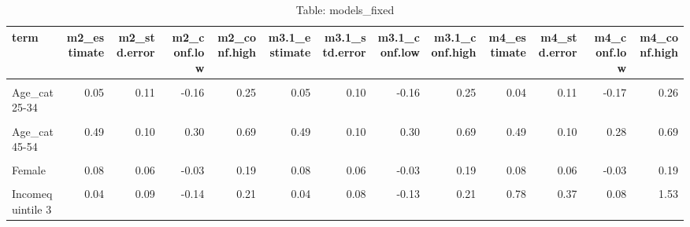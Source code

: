\begin{table}
\centering
\caption{Table:  models_fixed}
\centering
\fontsize{10}{12}\selectfont
\begin{tabular}[t]{lrrrrrrrrrrrr}
\toprule
term & m2\_estimate & m2\_std.error & m2\_conf.low & m2\_conf.high & m3.1\_estimate & m3.1\_std.error & m3.1\_conf.low & m3.1\_conf.high & m4\_estimate & m4\_std.error & m4\_conf.low & m4\_conf.high\\
\midrule
\cellcolor{gray!10}{(Intercept)} & \cellcolor{gray!10}{-2.54} & \cellcolor{gray!10}{0.51} & \cellcolor{gray!10}{-3.77} & \cellcolor{gray!10}{-1.37} & \cellcolor{gray!10}{-2.65} & \cellcolor{gray!10}{0.34} & \cellcolor{gray!10}{-3.38} & \cellcolor{gray!10}{-1.86} & \cellcolor{gray!10}{-3.18} & \cellcolor{gray!10}{0.45} & \cellcolor{gray!10}{-4.13} & \cellcolor{gray!10}{-2.19}\\
Age\_cat25-34 & 0.05 & 0.11 & -0.16 & 0.25 & 0.05 & 0.10 & -0.16 & 0.25 & 0.04 & 0.11 & -0.17 & 0.26\\
\cellcolor{gray!10}{Age\_cat35-44} & \cellcolor{gray!10}{0.26} & \cellcolor{gray!10}{0.10} & \cellcolor{gray!10}{0.06} & \cellcolor{gray!10}{0.47} & \cellcolor{gray!10}{0.26} & \cellcolor{gray!10}{0.11} & \cellcolor{gray!10}{0.05} & \cellcolor{gray!10}{0.45} & \cellcolor{gray!10}{0.25} & \cellcolor{gray!10}{0.11} & \cellcolor{gray!10}{0.05} & \cellcolor{gray!10}{0.46}\\
Age\_cat45-54 & 0.49 & 0.10 & 0.30 & 0.69 & 0.49 & 0.10 & 0.30 & 0.69 & 0.49 & 0.10 & 0.28 & 0.69\\
\cellcolor{gray!10}{Age\_cat55+} & \cellcolor{gray!10}{0.96} & \cellcolor{gray!10}{0.09} & \cellcolor{gray!10}{0.79} & \cellcolor{gray!10}{1.13} & \cellcolor{gray!10}{0.96} & \cellcolor{gray!10}{0.09} & \cellcolor{gray!10}{0.78} & \cellcolor{gray!10}{1.13} & \cellcolor{gray!10}{0.96} & \cellcolor{gray!10}{0.09} & \cellcolor{gray!10}{0.79} & \cellcolor{gray!10}{1.14}\\
\addlinespace
Female & 0.08 & 0.06 & -0.03 & 0.19 & 0.08 & 0.06 & -0.03 & 0.19 & 0.08 & 0.06 & -0.03 & 0.19\\
\cellcolor{gray!10}{Incomequintile 2} & \cellcolor{gray!10}{-0.03} & \cellcolor{gray!10}{0.09} & \cellcolor{gray!10}{-0.21} & \cellcolor{gray!10}{0.15} & \cellcolor{gray!10}{-0.03} & \cellcolor{gray!10}{0.09} & \cellcolor{gray!10}{-0.21} & \cellcolor{gray!10}{0.14} & \cellcolor{gray!10}{0.08} & \cellcolor{gray!10}{0.38} & \cellcolor{gray!10}{-0.70} & \cellcolor{gray!10}{0.83}\\
Incomequintile 3 & 0.04 & 0.09 & -0.14 & 0.21 & 0.04 & 0.08 & -0.13 & 0.21 & 0.78 & 0.37 & 0.08 & 1.53\\

\end{tabular}
\end{table}
